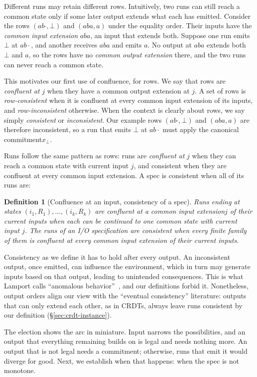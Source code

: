 \documentclass[sigconf]{cidr-2027}
\newtheorem{definition}{Definition}
\theoremstyle{remark}
\newcommand{\commitment}{commitment\xspace}
\newcommand{\inrel}{extends\xspace}          %
\newcommand{\indesc}{input extension\xspace} %
\newcommand{\outrel}{extends\xspace}          %
\newcommand{\outrelbase}{extend\xspace}       %
\newcommand{\outnoun}{output extension\xspace}%
\newcommand{\spectype}[1][]{I/O specification#1\xspace}
\begin{document}
Different runs may retain different rows.  Intuitively, two runs can still
reach a common state only if some later output extends what each has emitted.
Consider the rows $(ab\cdot,\bot)$ and $(aba,a)$ under the equality order.
Their inputs have the \emph{common \indesc} $aba$, an input that \inrel both.
Suppose one run emits $\bot$ at $ab\cdot$, and another receives $aba$ and
emits $a$.  No output at $aba$ \outrel both $\bot$ and $a$, so the rows have
no \emph{common \outnoun} there, and the two runs can never reach a common
state.

This motivates our first use of confluence, for rows.  We say that rows are
\emph{confluent at} $j$ when they have a common \outnoun at $j$.  A set of rows is
\emph{row-consistent} when it is confluent at every common \indesc of its
inputs, and \emph{row-inconsistent} otherwise.  When the context is clearly
about rows, we say simply \emph{consistent} or \emph{inconsistent}.
Our example rows $(ab\cdot,\bot)$ and $(aba,a)$ are therefore inconsistent, so a run that emits $\bot$ at $ab\cdot$ must apply the canonical \commitment $x_\bot$.

Runs follow the same pattern as rows: runs are \emph{confluent at} $j$ when they can
reach a common state with current input $j$, and consistent when they are
confluent at every common \indesc.  A spec is consistent when all of its
runs are:

\begin{definition}[Confluence at an input, consistency of a spec]
\label{def:consistency}
Runs ending at states $(i_1,R_1),\ldots,(i_k,R_k)$ are \emph{confluent at} a
common \indesc $j$ of their current inputs when each can be continued to one
common state with current input $j$.  The runs of an \spectype are
\emph{consistent} when every finite family of them is confluent at every common
\indesc of their current inputs.
\end{definition}

Consistency as we define it has to hold after every output.  An inconsistent
output, once emitted, can influence the environment, which in turn may generate
inputs based on that output, leading to unintended consequences.  This is what
Lamport calls ``anomalous behavior''~\cite{lamport1978time}, and our
definitions forbid it.  Nonetheless, output orders align our view with the ``eventual
consistency'' literature: outputs that can only \outrelbase each other, as in
CRDTs, always leave runs consistent by our definition (\S\ref{sec:crdt-instance}).

The election shows the arc in miniature.  Input narrows the
possibilities, and an output that everything remaining builds on is legal and
needs nothing more.  An output that is not legal needs a \commitment; otherwise,
runs that emit it would diverge for good.  Next, we establish when that
happens: when the spec is not monotone.
\end{document}
